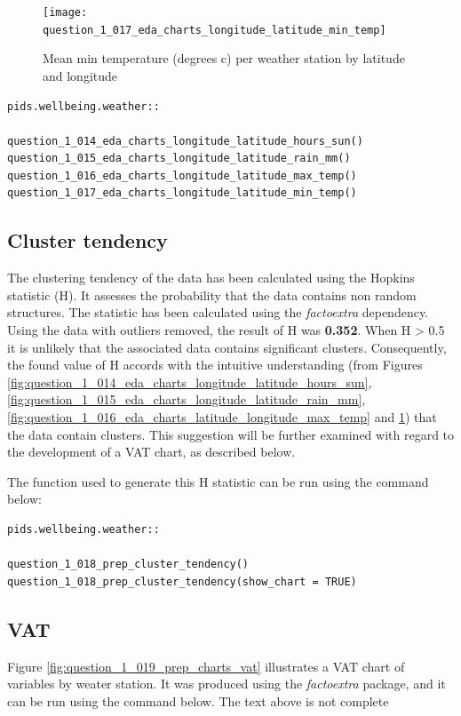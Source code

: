 \documentclass[12pt, oneside, openany]{book}
\begin{document}
\begin{figure}
	\centering
	\captionsetup{justification=centering}
	\texttt{[image: question\_1\_017\_eda\_charts\_longitude\_latitude\_min\_temp]}
	\caption{Mean min temperature (degrees c) per weather station by latitude and longitude}
	\label{fig:question_1_017_eda_charts_longitude_latitude_min_temp}
\end{figure}

\bigskip
\begin{lstlisting}
pids.wellbeing.weather::

question_1_014_eda_charts_longitude_latitude_hours_sun()
question_1_015_eda_charts_longitude_latitude_rain_mm()
question_1_016_eda_charts_longitude_latitude_max_temp()
question_1_017_eda_charts_longitude_latitude_min_temp()
\end{lstlisting}

\subsection*{Cluster tendency}
The clustering tendency of the data has been calculated using the Hopkins statistic (H). It assesses the probability that the data contains non random structures. The statistic has been calculated using the \emph{factoextra} dependency. Using the data with outliers removed, the result of H was \textbf{0.352}. When H > 0.5 it is unlikely that the associated data contains significant clusters. Consequently, the found value of H accords with the intuitive understanding (from Figures \ref{fig:question_1_014_eda_charts_longitude_latitude_hours_sun},  \ref{fig:question_1_015_eda_charts_longitude_latitude_rain_mm}, \ref{fig:question_1_016_eda_charts_latitude_longitude_max_temp} and \ref{fig:question_1_017_eda_charts_longitude_latitude_min_temp}) that the data contain clusters. This suggestion will be further examined with regard to the development of a VAT chart, as described below.

The function used to generate this H statistic can be run using the command below:
\bigskip
\begin{lstlisting}
pids.wellbeing.weather::

question_1_018_prep_cluster_tendency()
question_1_018_prep_cluster_tendency(show_chart = TRUE)
\end{lstlisting}

\subsection*{VAT}
Figure \ref{fig:question_1_019_prep_charts_vat} illustrates a VAT chart of variables by weater station. It was produced using the \emph{factoextra} package, and it can be run using the command below.
\color{red}The text above is not complete\color{black}
\end{document}
